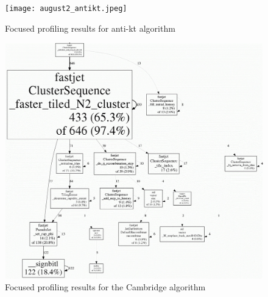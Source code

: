 \begin{figure}[H]
    \centering
\texttt{[image: august2\_antikt.jpeg]}
    \caption{Focused profiling results for anti-kt algorithm}
    \label{fig:gperfnatikt}
\end{figure}

\begin{figure}[H]
    \centering
\includegraphics[width=1\linewidth]{images/august2_camb.jpg}
    \caption{Focused profiling results for the Cambridge algorithm}
    \label{fig:gperfcamb}
\end{figure}